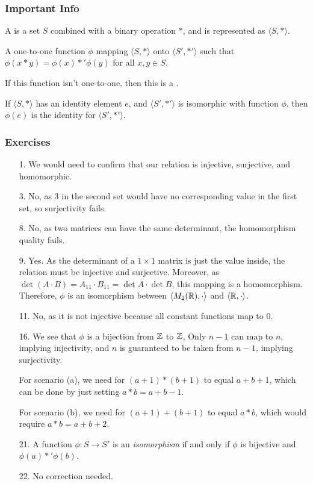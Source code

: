 \documentclass{article}
\begin{document}
\subsubsection{Important Info}
A  is a set $S$ combined with a binary operation $*$, and is represented as $\langle S, * \rangle$.

\begin{definition}[Isomorphism]
    A one-to-one function $\phi$ mapping $\langle S, * \rangle$ onto $\langle S', *' \rangle$ such that $\phi(x * y) = \phi(x) *' \phi(y)$ for all $x, y \in S$.

    If this function isn't one-to-one, then this is a .
\end{definition}

\begin{thm}
    If $\langle S, * \rangle$ has an identity element $e$, and $\langle S', *' \rangle$ is isomorphic with function $\phi$, then $\phi(e)$ is the identity for $\langle S', *' \rangle$.
\end{thm}

\subsubsection{Exercises}
\begin{enumerate}
    \item[1.] We would need to confirm that our relation is injective, surjective, and homomorphic.
    \item[3.] No, as $3$ in the second set would have no corresponding value in the first set, so surjectivity fails.
    \item[8.] No, as two matrices can have the same determinant, the homomorphism quality fails.
    \item[9.] Yes. As the determinant of a $1 \times 1$ matrix is just the value inside, the relation must be injective and surjective. Moreover, as $\det(A \cdot B) = A_{11} \cdot B_{11} = \det A \cdot \det B$, this mapping is a homomorphism. Therefore, $\phi$ is an isomorphism between $\langle M_2(\mathbb{R}), \cdot \rangle$ and $\langle \mathbb{R}, \cdot \rangle$.
    \item[11.] No, as it is not injective because all constant functions map to $0$. 
    \item[16.] We see that $\phi$ is a bijection from $\mathbb{Z}$ to $\mathbb{Z}$, Only $n - 1$ can map to $n$, implying injectivity, and $n$ is guaranteed to be taken from $n - 1$, implying surjectivity. 

    For scenario (a), we need for $(a + 1) * (b + 1)$ to equal $a + b + 1$, which can be done by just setting $a * b = a + b - 1$.

    For scenario (b), we need for $(a + 1) + (b + 1)$ to equal $a * b$, which would require $a * b = a + b + 2$.
    \item[21.] A function $\phi : S \to S'$ is an \textit{isomorphism} if and only if $\phi$ is bijective and $\phi(a) *' \phi(b)$.
    \item[22.] No correction needed.
\end{enumerate}
\end{document}
